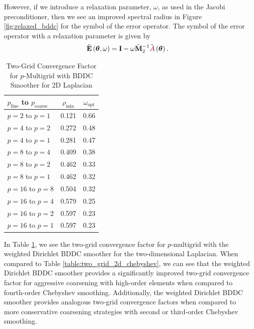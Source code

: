 However, if we introduce a relaxation parameter, $\omega$, as used in the Jacobi preconditioner, then we see an improved spectral radius in Figure \ref{fig:relaxed_bddc} for the symbol of the error operator.
The symbol of the error operator with a relaxation parameter is given by
\begin{equation}
\tilde{\mathbf{E}} \left( \boldsymbol{\theta}, \omega \right) = \mathbf{I} - \omega \tilde{\mathbf{M}}_2^{-1} \tilde{{\color{burgundy}A}} \left( \boldsymbol{\theta} \right).
\end{equation}

\begin{table}[ht!]
\begin{center}
\begin{tabular}{l cc}
  \toprule
  $p_{\text{fine}}$ to $p_{\text{coarse}}$  & $\rho_{\min}$ & $\omega_{\text{opt}}$  \\
  \toprule
  $p = 2$ to $p = 1$   &  0.121 & 0.66  \\
  \midrule
  $p = 4$ to $p = 2$   &  0.272 & 0.48  \\
  $p = 4$ to $p = 1$   &  0.281 & 0.47  \\
  \midrule
  $p = 8$ to $p = 4$   &  0.409 & 0.38  \\
  $p = 8$ to $p = 2$   &  0.462 & 0.33  \\
  $p = 8$ to $p = 1$   &  0.462 & 0.32  \\
  \midrule
  $p = 16$ to $p = 8$  &  0.504 & 0.32  \\
  $p = 16$ to $p = 4$  &  0.579 & 0.25  \\
  $p = 16$ to $p = 2$  &  0.597 & 0.23  \\
  $p = 16$ to $p = 1$  &  0.597 & 0.23  \\
  \bottomrule
\end{tabular}
\end{center}
\caption{Two-Grid Convergence Factor for $p$-Multigrid with BDDC Smoother for 2D Laplacian}
\label{table:two_grid_bddc_smoother}
\end{table}

In Table \ref{table:two_grid_bddc_smoother}, we see the two-grid convergence factor for $p$-multigrid with the weighted Dirichlet BDDC smoother for the two-dimensional Laplacian.
When compared to Table \ref{table:two_grid_2d_chebyshev}, we can see that the weighted Dirichlet BDDC smoother provides a significantly improved two-grid convergence factor for aggressive coarsening with high-order elements when compared to fourth-order Chebyshev smoothing.
Additionally, the weighted Dirichlet BDDC smoother provides analogous two-grid convergence factors when compared to more conservative coarsening strategies with second or third-order Chebyshev smoothing.

